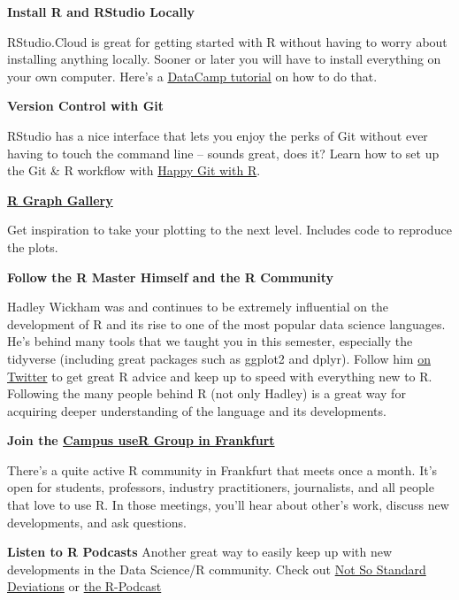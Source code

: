 \documentclass[
  11pt,
]{book}
\newenvironment{tips}[1]
  {
  \begin{itemize}
  \footnotesize
  \renewcommand{\labelitemi}{
    \raisebox{-.7\height}[0pt][0pt]{
      {\setkeys{Gin}{width=3em,keepaspectratio}
        \texttt{[image: images/\#1.png]}}
    }
  }
  \setlength{\fboxsep}{1em}
  \begin{rbox}
  \item
  }
  {
  \end{rbox}
  \end{itemize}
  }
\begin{document}
\begin{tips}r

\textbf{Install R and RStudio Locally}

RStudio.Cloud is great for getting started with R without having to worry about installing anything locally. Sooner or later you will have to install everything on your own computer. Here's a \href{https://www.datacamp.com/community/tutorials/installing-R-windows-mac-ubuntu}{DataCamp tutorial} on how to do that.

\textbf{Version Control with Git}

RStudio has a nice interface that lets you enjoy the perks of Git without ever having to touch the command line -- sounds great, does it? Learn how to set up the Git \& R workflow with \href{https://happygitwithr.com/}{Happy Git with R}.

\textbf{\href{https://www.r-graph-gallery.com/}{R Graph Gallery}}

Get inspiration to take your plotting to the next level. Includes code to reproduce the plots.

\textbf{Follow the R Master Himself and the R Community}

Hadley Wickham was and continues to be extremely influential on the development of R and its rise to one of the most popular data science languages. He's behind many tools that we taught you in this semester, especially the tidyverse (including great packages such as ggplot2 and dplyr). Follow him \href{https://twitter.com/hadleywickham}{on Twitter} to get great R advice and keep up to speed with everything new to R. Following the many people behind R (not only Hadley) is a great way for acquiring deeper understanding of the language and its developments.

\textbf{Join the \href{https://www.meetup.com/r-frankfurt/}{Campus useR Group in Frankfurt}}

There's a quite active R community in Frankfurt that meets once a month. It's open for students, professors, industry practitioners, journalists, and all people that love to use R. In those meetings, you'll hear about other's work, discuss new developments, and ask questions.

\textbf{Listen to R Podcasts}
Another great way to easily keep up with new developments in the Data Science/R community. Check out
\href{http://nssdeviations.com/}{Not So Standard Deviations} or \href{https://r-podcast.org/}{the R-Podcast}

\end{tips}
\end{document}

